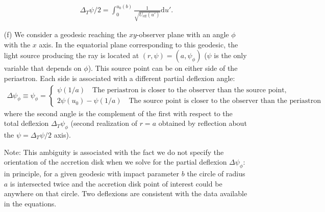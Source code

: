 \documentclass[10pt, a4paper]{article}
\begin{document}
\begin{enumerate}
  \begin{align*}
    \Delta_T \psi/2 = \int_{0}^{u_0(b)} \frac{1}{\sqrt{U_{\text{eff}}(u')}}\text{d}u'. 
  \end{align*}
  \item[(f)]  We consider a geodesic reaching the $xy$-observer plane with an angle $\phi$ with the $x$ axis. In the equatorial plane corresponding to this geodesic, the light source producing the ray is located at $(r, \psi) = (a, \psi_\phi)$ ($\psi$ is the only variable that depends on $\phi$). This source point can be on either side of the periastron. Each side is associated with a different partial deflexion angle:
  \begin{align*}
  \Delta \psi_\phi \equiv \psi_\phi=\left\{\begin{array}{l}\psi(1/a) \quad \text{The periastron is closer to the observer than the source point,} \\ 2\psi\left(u_0\right)-\psi\left(1 / a\right)\quad \text{The source point is closer to the observer than the periastron}\end{array}\right.
  \end{align*}
  where the second angle is the complement of the first with respect to the total deflexion $\Delta_T \psi_\phi$ (second realization of $r = a$ obtained by reflection about the $\psi = \Delta_T \psi/2$ axis). 

  Note: This ambiguity is associated with the fact we do not specify the orientation of the accretion disk when we solve for the partial deflexion $\Delta \psi_\phi$: in principle, for a given geodesic with impact parameter $b$ the circle of radius $a$ is intersected twice and the accretion disk point of interest could be anywhere on that circle. Two deflexions are consistent with the data available in the equations. 
\end{enumerate}
\newpage
\end{document}
